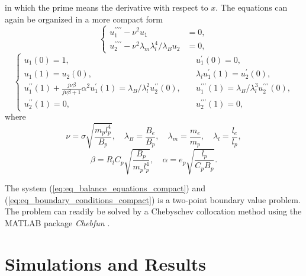 \documentclass{elsarticle}
\begin{document}
in which the prime means the derivative with respect to $x$. The equations can again be organized in a more compact form
\begin{equation}
    \left\{\begin{aligned}
         u_1^{\prime\prime\prime\prime} - \nu^2 u_1 &= 0, \\
         u_2^{\prime\prime\prime\prime} - \nu^2 \lambda_m \lambda_l^4 / \lambda_B u_2 &= 0,
    \end{aligned}\right.
    \label{eq:eq_balance_equations_compact}
\end{equation}
\begin{equation}
    \left\{\begin{aligned}
        u_1(0) = 1 , &\quad u_1^\prime(0) = 0, \\
        u_1(1) = u_2(0), &\quad \lambda_l u_1^\prime(1) = u_2^\prime(0), \\
        u_1^{\prime\prime}(1) + \frac{ j \nu \beta }{ j \nu \beta + 1 } \alpha^2 u_1^{\prime}(1) = \lambda_B/ \lambda_l^2 u_2^{\prime\prime}(0) , &\quad u_1^{\prime\prime\prime}(1) = \lambda_B/ \lambda_l^3 u_2^{\prime\prime\prime}(0), \\
        u_2^{\prime\prime}(1) = 0 , &\quad u_2^{\prime\prime\prime}(1) = 0,
    \end{aligned}\right.
    \label{eq:eq_boundary_conditions_compact}
\end{equation}
where 
\begin{equation}
    \nu = \sigma \sqrt{ \frac{ m_p l_p^4 }{ B_p } },\quad \lambda_B = \frac{B_e}{B_p},\quad \lambda_m = \frac{m_e}{m_p},\quad \lambda_l = \frac{l_e}{l_p},
\end{equation}
\begin{equation}
    \beta = R_l C_p \sqrt{\frac{B_p}{m_p l_p^4}}, \quad \alpha = e_p \sqrt{\frac{l_p}{C_p B_p}}.
\end{equation}

The system (\ref{eq:eq_balance_equations_compact}) and (\ref{eq:eq_boundary_conditions_compact}) is a two-point boundary value problem. The problem can readily be solved by a Chebyschev collocation method using the MATLAB package \textit{Chebfun} \cite{driscoll2014chebfun}. 

\section{Simulations and Results}
\end{document}
